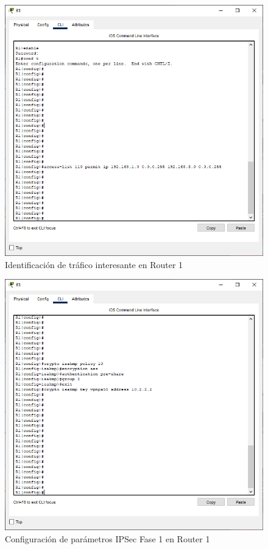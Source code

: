 \documentclass{article}
\begin{document}
        \begin{figure}[!h]
            \centering
            \includegraphics[scale=0.45]{img/task1-step2.png}
            \caption{Identificación de tráfico interesante en Router 1}
            \label{fig:task1-step2}
        \end{figure}

        \clearpage
        \begin{figure}[!h]
            \centering
            \includegraphics[scale=0.45]{img/task1-step3.png}
            \caption{Configuración de parámetros IPSec Fase 1 en Router 1}
            \label{fig:task1-step3}
        \end{figure}
\end{document}
